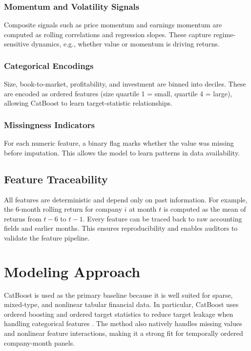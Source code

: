 \documentclass[11pt]{article}
\begin{document}
\subsubsection{Momentum and Volatility Signals}
Composite signals such as price momentum and earnings momentum are computed as rolling correlations and regression slopes. These capture regime-sensitive dynamics, e.g., whether value or momentum is driving returns.

\subsubsection{Categorical Encodings}
Size, book-to-market, profitability, and investment are binned into deciles. These are encoded as ordered features (size quartile 1 = small, quartile 4 = large), allowing CatBoost to learn target-statistic relationships.

\subsubsection{Missingness Indicators}
For each numeric feature, a binary flag marks whether the value was missing before imputation. This allows the model to learn patterns in data availability.

\subsection{Feature Traceability}
All features are deterministic and depend only on past information. For example, the 6-month rolling return for company $i$ at month $t$ is computed as the mean of returns from $t-6$ to $t-1$. Every feature can be traced back to raw accounting fields and earlier months. This ensures reproducibility and enables auditors to validate the feature pipeline.

\section{Modeling Approach}

CatBoost is used as the primary baseline because it is well suited for sparse, mixed-type, and nonlinear tabular financial data. In particular, CatBoost uses ordered boosting and ordered target statistics to reduce target leakage when handling categorical features \cite{prokhorenkova2018catboost}. The method also natively handles missing values and nonlinear feature interactions, making it a strong fit for temporally ordered company-month panels.
\end{document}
